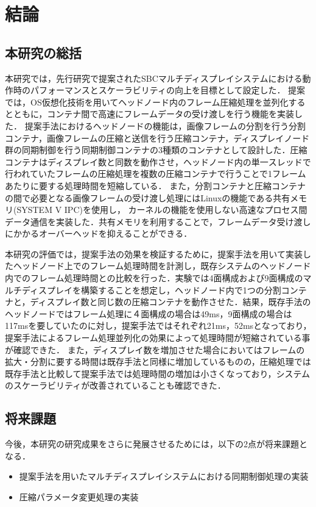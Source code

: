 \chapter{結論}

\section{本研究の総括}
本研究では，先行研究で提案されたSBCマルチディスプレイシステムにおける動作時のパフォーマンスとスケーラビリティの向上を目標として設定した．
提案では，OS仮想化技術を用いてヘッドノード内のフレーム圧縮処理を並列化するとともに，コンテナ間で高速にフレームデータの受け渡しを行う機能を実装した．
提案手法におけるヘッドノードの機能は，画像フレームの分割を行う分割コンテナ，画像フレームの圧縮と送信を行う圧縮コンテナ，ディスプレイノード群の同期制御を行う同期制御コンテナの3種類のコンテナとして設計した．圧縮コンテナはディスプレイ数と同数を動作させ，ヘッドノード内の単一スレッドで行われていたフレームの圧縮処理を複数の圧縮コンテナで行うことで1フレームあたりに要する処理時間を短縮している．
また，分割コンテナと圧縮コンテナの間で必要となる画像フレームの受け渡し処理にはLinuxの機能である共有メモリ(SYSTEM V IPC)を使用し，
カーネルの機能を使用しない高速なプロセス間データ通信を実装した．共有メモリを利用することで，フレームデータ受け渡しにかかるオーバーヘッドを抑えることができる．



本研究の評価では，提案手法の効果を検証するために，提案手法を用いて実装したヘッドノード上でのフレーム処理時間を計測し，既存システムのヘッドノード内でのフレーム処理時間との比較を行った．実験では4面構成および9面構成のマルチディスプレイを構築することを想定し，ヘッドノード内で1つの分割コンテナと，ディスプレイ数と同じ数の圧縮コンテナを動作させた．結果，既存手法のヘッドノードではフレーム処理に４面構成の場合は49ms，9面構成の場合は117msを要していたのに対し，提案手法ではそれぞれ21ms，52msとなっており，提案手法によるフレーム処理並列化の効果によって処理時間が短縮されている事が確認できた．
また，ディスプレイ数を増加させた場合においてはフレームの拡大・分割に要する時間は既存手法と同様に増加しているものの，圧縮処理では既存手法と比較して提案手法では処理時間の増加は小さくなっており，システムのスケーラビリティが改善されていることも確認できた．

\section{将来課題}
今後，本研究の研究成果をさらに発展させるためには，以下の2点が将来課題となる．
\begin{itemize}
    \item 提案手法を用いたマルチディスプレイシステムにおける同期制御処理の実装
    \item 圧縮パラメータ変更処理の実装
\end{itemize}

